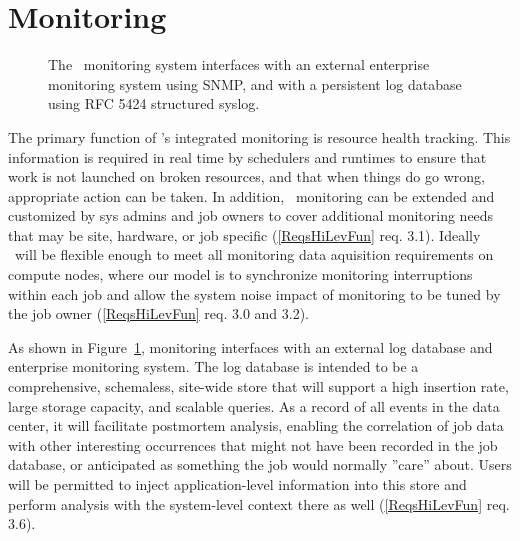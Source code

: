 \section{Monitoring}

\begin{figure}
\centering
{}
\caption{The \ngrm\ monitoring system interfaces with an external
enterprise monitoring system using SNMP, and with a persistent log
database using RFC 5424 structured syslog.}
\label{FigMonExt}
\end{figure}

The primary function of \ngrm's integrated monitoring is resource
health tracking.  This information is required in real time by schedulers
and runtimes to ensure that work is not launched on broken resources,
and that when things do go wrong, appropriate action can be taken.
In addition, \ngrm\ monitoring can be extended and customized
by sys admins and job owners to cover additional monitoring needs
that may be site, hardware, or job specific
(\ref{ReqsHiLevFun} req. 3.1).
Ideally \ngrm\ will be flexible enough to meet all
monitoring data aquisition requirements on compute nodes,
where our model is to synchronize monitoring interruptions within each job
and allow the system noise impact of monitoring to be tuned by the job owner
(\ref{ReqsHiLevFun} req. 3.0 and 3.2).

As shown in Figure~\ref{FigMonExt}, monitoring interfaces with an external
log database and enterprise monitoring system.
The log database is intended to be a comprehensive, schemaless, site-wide
store that will support a high insertion rate, large storage capacity,
and scalable queries.
As a record of all events in the data center, it will facilitate
postmortem analysis, enabling the correlation of job data with other
interesting occurrences that might not have been recorded in the job
database, or anticipated as something the job would normally ''care'' about.
Users will be permitted to inject application-level information into this
store and perform analysis with the system-level context there as well
(\ref{ReqsHiLevFun} req. 3.6).

